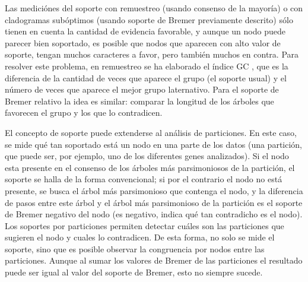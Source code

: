 Las medici\'ones del soporte con remuestreo (usando consenso de la mayor\'ia) o con cladogramas sub\'optimos (usando soporte de Bremer previamente descrito) s\'olo tienen en cuenta la cantidad de evidencia favorable, y aunque un nodo puede parecer bien soportado, es posible que nodos que aparecen con alto valor de soporte, tengan muchos caracteres a favor, pero tambi\'en muchos en contra. Para resolver este problema, en remuestreo se ha elaborado el \'indice GC \cite{Goloboff2003}, que es la diferencia de la cantidad de veces que aparece el grupo (el soporte usual) y el n\'umero de veces que aparece el mejor grupo laternativo. Para el soporte de Bremer relativo \cite{Goloboff2001} la idea es similar: comparar la longitud de los \'arboles que favorecen el grupo y los que lo contradicen.

El concepto de soporte puede extenderse al an\'alisis de particiones. En este caso, se mide qu\'e tan soportado est\'a un nodo en una parte de los datos (una partici\'on, que puede ser, por ejemplo, uno de los diferentes genes analizados). Si el nodo esta presente en el consenso de los \'arboles m\'as parsimoniosos de la partici\'on, el soporte se halla de la forma convencional; si por el contrario el nodo no est\'a presente, se busca el \'arbol m\'as parsimonioso que contenga el nodo, y la diferencia de pasos entre este \'arbol y el \'arbol m\'as parsimonioso de la partici\'on es el soporte de Bremer negativo del nodo (es negativo, indica qu\'e tan contradicho es el nodo). Los soportes por particiones permiten detectar cu\'ales son las particiones que sugieren el nodo y cuales lo contradicen. De esta forma, no solo se mide el soporte, sino que es posible observar la congruencia por nodos entre las particiones. Aunque al sumar los valores de Bremer de las particiones el resultado puede ser igual al valor del soporte de Bremer, esto no siempre sucede.



